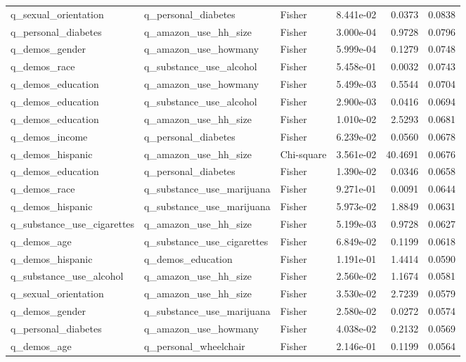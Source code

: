 \begin{longtable}[t]{llllrr}
\addlinespace
q\_sexual\_orientation & q\_personal\_diabetes & Fisher & 8.441e-02 & 0.0373 & 0.0838\\
q\_personal\_diabetes & q\_amazon\_use\_hh\_size & Fisher & 3.000e-04 & 0.9728 & 0.0796\\
q\_demos\_gender & q\_amazon\_use\_howmany & Fisher & 5.999e-04 & 0.1279 & 0.0748\\
q\_demos\_race & q\_substance\_use\_alcohol & Fisher & 5.458e-01 & 0.0032 & 0.0743\\
q\_demos\_education & q\_amazon\_use\_howmany & Fisher & 5.499e-03 & 0.5544 & 0.0704\\
\addlinespace
q\_demos\_education & q\_substance\_use\_alcohol & Fisher & 2.900e-03 & 0.0416 & 0.0694\\
q\_demos\_education & q\_amazon\_use\_hh\_size & Fisher & 1.010e-02 & 2.5293 & 0.0681\\
q\_demos\_income & q\_personal\_diabetes & Fisher & 6.239e-02 & 0.0560 & 0.0678\\
q\_demos\_hispanic & q\_amazon\_use\_hh\_size & Chi-square & 3.561e-02 & 40.4691 & 0.0676\\
q\_demos\_education & q\_personal\_diabetes & Fisher & 1.390e-02 & 0.0346 & 0.0658\\
\addlinespace
q\_demos\_race & q\_substance\_use\_marijuana & Fisher & 9.271e-01 & 0.0091 & 0.0644\\
q\_demos\_hispanic & q\_substance\_use\_marijuana & Fisher & 5.973e-02 & 1.8849 & 0.0631\\
q\_substance\_use\_cigarettes & q\_amazon\_use\_hh\_size & Fisher & 5.199e-03 & 0.9728 & 0.0627\\
q\_demos\_age & q\_substance\_use\_cigarettes & Fisher & 6.849e-02 & 0.1199 & 0.0618\\
q\_demos\_hispanic & q\_demos\_education & Fisher & 1.191e-01 & 1.4414 & 0.0590\\
\addlinespace
q\_substance\_use\_alcohol & q\_amazon\_use\_hh\_size & Fisher & 2.560e-02 & 1.1674 & 0.0581\\
q\_sexual\_orientation & q\_amazon\_use\_hh\_size & Fisher & 3.530e-02 & 2.7239 & 0.0579\\
q\_demos\_gender & q\_substance\_use\_marijuana & Fisher & 2.580e-02 & 0.0272 & 0.0574\\
q\_personal\_diabetes & q\_amazon\_use\_howmany & Fisher & 4.038e-02 & 0.2132 & 0.0569\\
q\_demos\_age & q\_personal\_wheelchair & Fisher & 2.146e-01 & 0.1199 & 0.0564\\

\end{longtable}
